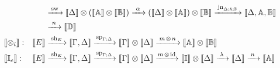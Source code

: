 \begin{align*}
     & &  &\xrightarrow{\hspace{2pt}\text{sw}\hspace{2pt}}  [\![\Delta ]\!] \otimes ([\![\mathbb{A} ]\!] \otimes [\![\mathbb{B} ]\!]) \xrightarrow{\hspace{3pt}\alpha\hspace{3pt}}  ([\![\Delta ]\!] \otimes [\![\mathbb{A} ]\!]) \otimes [\![\mathbb{B} ]\!] \xrightarrow{\hspace{2pt}\text{jn}_{\Delta; \mathbb{A}; \mathbb{B} }\hspace{2pt}}  \llbracket \Delta, \mathbb{A},\mathbb{B}  \rrbracket  \\
     &&& \xrightarrow{\hspace{3pt}n\hspace{3pt}} \llbracket \mathbb{D} \rrbracket \\
    & \hspace{-20pt}\llbracket \otimes_i \rrbracket : & [\![E]\!] & \xrightarrow{\hspace{2pt}\text{sh}_{E}\hspace{2pt}}   [\![\Gamma,\Delta ]\!]   \xrightarrow{\hspace{1pt}\text{sp}_{\Gamma;\Delta}\hspace{1pt}}  [\![\Gamma ]\!] \otimes [\![\Delta ]\!]  \xrightarrow{\hspace{2pt} m \hspace{1pt} \otimes \hspace{1pt} n \hspace{2pt}} [\![\mathbb{A} ]\!] \otimes [\![\mathbb{B} ]\!] \\
    &\hspace{-20pt}\llbracket \mathbb{I}_e \rrbracket :  & [\![E]\!] & \xrightarrow{\hspace{2pt}\text{sh}_{E}\hspace{2pt}}   [\![\Gamma,\Delta ]\!]   \xrightarrow{\hspace{1pt}\text{sp}_{\Gamma;\Delta}\hspace{1pt}}  [\![\Gamma ]\!] \otimes [\![\Delta ]\!] \xrightarrow{ m \hspace{1pt} \otimes \hspace{1pt} \id} [\![\mathbb{I} ]\!]\otimes [\![\Delta ]\!] \xrightarrow{\hspace{2pt} \lambda \hspace{3pt}} [\![\Delta ]\!]  \xrightarrow{\hspace{2pt} n \hspace{3pt}}  \llbracket \mathbb{A} \rrbracket   \\

\end{align*}
